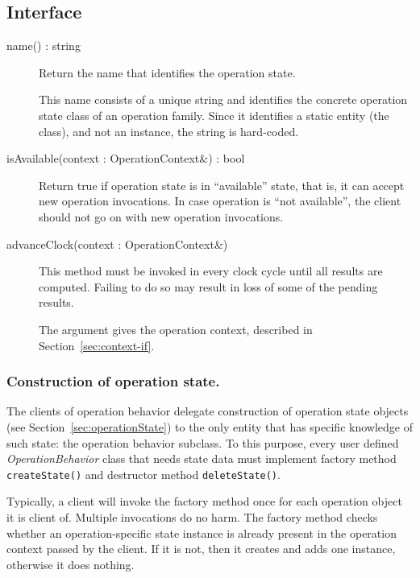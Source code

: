 \documentclass[a4paper,twoside]{tce}
\begin{document}
\subsection{Interface}

\begin{description}
\item[name() : string] %

  Return the name that identifies the operation state.

  This name consists of a unique string and identifies the concrete
  operation state class of an operation family. Since it identifies a static
  entity (the class), and not an instance, the string is hard-coded.

\item[isAvailable(context : OperationContext\&) : bool] %

  Return true if operation state is in ``available'' state, that is, it can
  accept new operation invocations. In case operation is ``not available'',
  the client should not go on with new operation invocations.

\item[advanceClock(context : OperationContext\&)] %

  This method must be invoked in every clock cycle until all results are
  computed. Failing to do so may result in loss of some of the pending
  results.

  The argument gives the operation context, described in
  Section~\ref{sec:context-if}.


\end{description}


\subsubsection{Construction of operation state.}
The clients of operation behavior delegate construction of operation state
objects (see Section~\ref{sec:operationState}) to the only entity that has
specific knowledge of such state: the operation behavior subclass.  To this
purpose, every user defined \emph{OperationBehavior} class that needs state
data must implement factory method \verb|createState()| and destructor
method \verb|deleteState()|.

Typically, a client will invoke the factory method once for each operation
object it is client of.  Multiple invocations do no harm.  The factory
method checks whether an operation-specific state instance is already
present in the operation context passed by the client.  If it is not, then
it creates and adds one instance, otherwise it does nothing.
\end{document}
